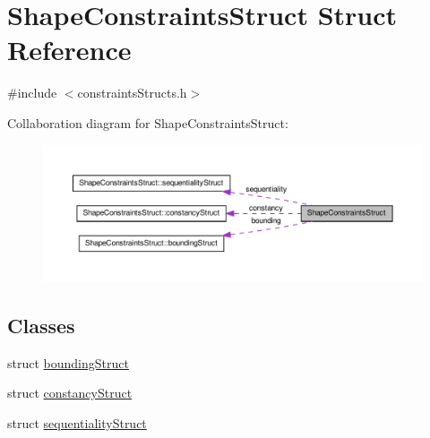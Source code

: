 \hypertarget{structShapeConstraintsStruct}{\section{\-Shape\-Constraints\-Struct \-Struct \-Reference}
\label{structShapeConstraintsStruct}
}


{\ttfamily \#include $<$constraints\-Structs.\-h$>$}



\-Collaboration diagram for \-Shape\-Constraints\-Struct\-:
\nopagebreak
\begin{figure}[H]
\begin{center}
\leavevmode
\includegraphics[width=350pt]{structShapeConstraintsStruct__coll__graph}
\end{center}
\end{figure}
\subsection*{\-Classes}
\begin{DoxyCompactItemize}
\item 
struct \hyperlink{structShapeConstraintsStruct_1_1boundingStruct}{bounding\-Struct}
\item 
struct \hyperlink{structShapeConstraintsStruct_1_1constancyStruct}{constancy\-Struct}
\item 
struct \hyperlink{structShapeConstraintsStruct_1_1sequentialityStruct}{sequentiality\-Struct}
\end{DoxyCompactItemize}
